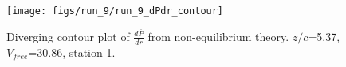 \begin{figure}[H]
\centering
\texttt{[image: figs/run\_9/run\_9\_dPdr\_contour]}
\caption{Diverging contour plot of $\frac{d\bar{P}}{dr}$ from non-equilibrium theory. $z/c$=5.37, $V_{free}$=30.86, station 1.}
\label{fig:run_9_dPdr_contour}
\end{figure}


